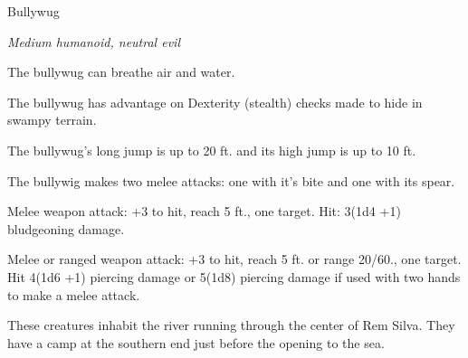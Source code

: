 \documentclass[letterpaper,10pt,twoside,twocolumn,openany]{book}
\begin{document}
\begin{monsterbox}{Bullywug}
	\begin{hangingpar}
		\textit{Medium humanoid, neutral evil}
	\end{hangingpar}
	\dndline%
	\basics[%
	armorclass = {15 (hide armor, shield)},
	hitpoints  = 11 (2d8 +2),
	speed      = {20 ft, swim 40 ft.}
	]
	\dndline%
	\stats[
	STR = \stat{12}, %
	DEX = \stat{12},
	CON = \stat{13},
	INT = \stat{7},
	WIS = \stat{10},
	CHA = \stat{7}
	]
	\dndline%
	\details[%
	skills = {stealth +3}
	senses = {passive perception 10},
	challenge = 1/4 (50 XP)
	]
	\dndline%
	\begin{monsteraction}[Amphibious]
		The bullywug can breathe air and water.
	\end{monsteraction}	
	\begin{monsteraction}
		The bullywug has advantage on Dexterity (stealth) checks made to hide in swampy terrain.
	\end{monsteraction}	
	\begin{monsteraction}
		The bullywug's long jump is up to 20 ft. and its high jump is up to 10 ft.
	\end{monsteraction}	

	\begin{monsteraction}[Multiattack]
		The bullywig makes two melee attacks: one with it's bite and one with its spear.
	\end{monsteraction}
	\begin{monsteraction}[Bite]
		Melee weapon attack: +3 to hit, reach 5 ft., one target. Hit: 3(1d4 +1) bludgeoning damage.
	\end{monsteraction}
	\begin{monsteraction}[Spear]
		Melee or ranged weapon attack: +3 to hit, reach 5 ft. or range 20/60., one target. Hit 4(1d6 +1) piercing damage or 5(1d8) piercing damage if used with two hands to make a melee attack. 
	\end{monsteraction}
		These creatures inhabit the river running through the center of Rem Silva. They have a camp at the southern end just before the opening to the sea.
\end{monsterbox}
\end{document}
